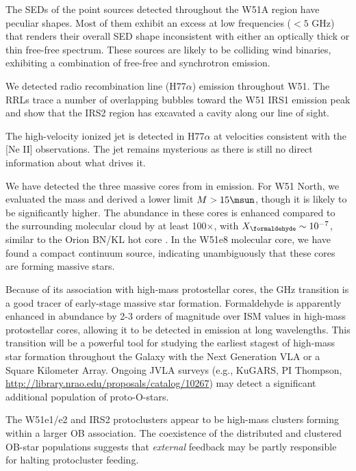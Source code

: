  The SEDs of the point sources detected throughout the W51A region have
 peculiar shapes.  Most of them exhibit an excess at low frequencies ($<5$ GHz)
 that renders their overall SED shape inconsistent with either an optically
 thick or thin free-free spectrum.  These sources are likely to be colliding
 wind binaries, exhibiting a combination of free-free and synchrotron emission.


 We detected radio recombination line (H77$\alpha$) emission throughout W51.
 The RRLs trace a number of overlapping bubbles toward the W51 IRS1 emission
 peak and show that the IRS2 region has excavated a cavity along our line of
 sight.  

 The \citet{Lacy2007a} high-velocity ionized jet is detected in H77$\alpha$ at
 velocities consistent with the [Ne II] observations.  The jet remains
 mysterious as there is still no direct information about what drives it.  

 We have detected the three massive cores from \citet{Zhang1997a} in
 \formaldehyde \twotwo emission.  For W51 North, we evaluated the mass and
 derived a lower limit $M>15 \msun$, though it is likely to be significantly
 higher.  The \formaldehyde abundance in these cores is enhanced compared to
 the surrounding molecular cloud by at least 100$\times$, with
 $X_{\formaldehyde} \sim 10^{-7}$, similar to the Orion BN/KL hot core
 \citep{Mangum1993b}.  In the W51e8 molecular core, we have found a compact
 continuum source, indicating unambiguously that these cores are forming
 massive stars.

 Because of its association with high-mass protostellar cores, the
 \formaldehyde {} GHz transition is a good tracer of early-stage
 massive star formation.  Formaldehyde is apparently enhanced in abundance by
 2-3 orders of magnitude over ISM values in high-mass protostellar cores,
 allowing it to be detected in emission at long wavelengths.  This transition
 will be a powerful tool for studying the earliest stagest of high-mass star
 formation throughout the Galaxy with the Next Generation VLA or a Square
 Kilometer Array.  Ongoing JVLA surveys (e.g., KuGARS, PI Thompson,
 \url{http://library.nrao.edu/proposals/catalog/10267}) may detect a
 significant additional population of proto-O-stars.

 The W51e1/e2 and IRS2 protoclusters appear to be high-mass clusters forming
 within a larger OB association.  The coexistence of the distributed and
 clustered OB-star populations suggests that \emph{external} feedback may be
 partly responsible for halting protocluster feeding.

